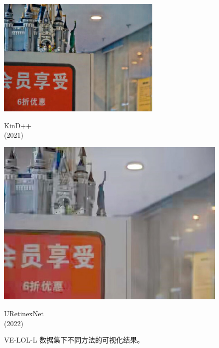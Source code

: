 \documentclass[CJK,aspectratio=169]{beamer}  %
\begin{document}
\begin{frame}
\begin{figure}
\begin{minipage}{.65\columnwidth}
\begin{minipage}{0.17\columnwidth}
					\includegraphics[width=\linewidth]{picture/LLIE/VE-LOL-L/KinD++}
					\caption*{\tiny KinD++ \\ (2021)}
					\label{fig: KinD++}	
				\end{minipage}
				\begin{minipage}{0.17\columnwidth}
					\includegraphics[width=\linewidth]{picture/LLIE/VE-LOL-L/URetinexNet}
					\caption*{\tiny URetinexNet \\ (2022)}
					\label{fig: URetinexNet}	
				\end{minipage}
				\caption{
					\label{fig: VE-LOL-L Visual} 
					\scriptsize 
					VE-LOL-L 数据集下不同方法的可视化结果。
				}
			\end{minipage}
		\end{figure}
	\end{frame}
	
\end{document}
